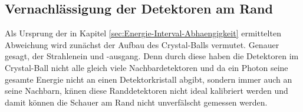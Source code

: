 \documentclass[a4paper,11pt,oneside,final,german,openbib,pdftex]{scrbook}
\begin{document}
{%




\subsection{Vernachl\"assigung der Detektoren am Rand}
\label{sec:Vernachlaessigung-der-Detektoren-am-Rand}

Als Ursprung der in Kapitel \ref{sec:Energie-Interval-Abhaengigkeit} ermittelten Abweichung wird zun\"achst der Aufbau des Crystal-Balls vermutet. Genauer gesagt, der Strahlenein und -ausgang. Denn durch diese haben die Detektoren im Crystal-Ball nicht alle gleich viele Nachbardetektoren und da ein Photon seine gesamte Energie nicht an einen Detektorkristall abgibt, sondern immer auch an seine Nachbarn, k\"nnen diese Randdetektoren nicht ideal kalibriert werden und damit k\"onnen die Schauer am Rand nicht unverf\"alscht gemessen werden. 




}
\end{document}
